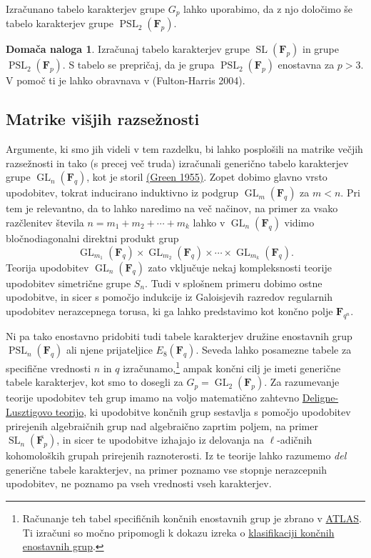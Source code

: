 \documentclass[11pt]{book}
\def\FF{\mathbf{F}}
\DeclareMathOperator\GL{GL}
\DeclareMathOperator\SL{SL}
\DeclareMathOperator\PSL{PSL}
\def\literatura{\color{modra}}
\theoremstyle{definition}
\theoremstyle{zgled}
\theoremstyle{odprtproblem}
\theoremstyle{domacanaloga}
\newtheorem*{domacanaloga}{Domača naloga}
\theoremstyle{izrek}
\begin{document}
Izračunano tabelo karakterjev grupe $G_p$ lahko uporabimo, da z njo določimo še tabelo karakterjev grupe $\PSL_2(\FF_p)$.

\begin{domacanaloga}
Izračunaj tabelo karakterjev grupe $\SL(\FF_p)$ in grupe $\PSL_2(\FF_p)$. S tabelo se prepričaj, da je grupa $\PSL_2(\FF_p)$ enostavna za $p > 3$. V pomoč ti je lahko obravnava v {\literatura (Fulton-Harris 2004)}.
\end{domacanaloga}

\subsection{Matrike višjih razsežnosti}

Argumente, ki smo jih videli v tem razdelku, bi lahko posplošili na matrike večjih razsežnosti in tako (s precej več truda) izračunali generično tabelo karakterjev grupe $\GL_n(\FF_q)$, kot je storil \href{https://www.jstor.org/stable/1992997#metadata_info_tab_contents}{(Green 1955)}. Zopet dobimo glavno vrsto upodobitev, tokrat inducirano induktivno iz podgrup $\GL_m(\FF_q)$ za $m < n$. Pri tem je relevantno, da to lahko naredimo na več načinov, na primer za vsako razčlenitev števila $n = m_1 + m_2 + \cdots + m_k$ lahko v $\GL_n(\FF_q)$ vidimo bločnodiagonalni direktni produkt grup
\[
    \textstyle  \GL_{m_1}(\FF_q) \times \GL_{m_2}(\FF_q) \times \cdots \times \GL_{m_k}(\FF_q).  
\]
Teorija upodobitev $\GL_n(\FF_q)$ zato vključuje nekaj kompleksnosti teorije upodobitev simetrične grupe $S_n$. Tudi v splošnem primeru dobimo ostne upodobitve, in sicer s pomočjo indukcije iz Galoisjevih razredov regularnih upodobitev nerazcepnega torusa, ki ga lahko predstavimo kot končno polje $\FF_{q^n}$.

Ni pa tako enostavno pridobiti tudi tabele karakterjev družine enostavnih grup $\PSL_n(\FF_q)$ ali njene prijateljice $E_8(\FF_q)$. Seveda lahko posamezne tabele za specifične vrednosti $n$ in $q$ izračunamo,\footnote{Računanje teh tabel specifičnih končnih enostavnih grup je zbrano v \href{http://brauer.maths.qmul.ac.uk/Atlas/v3/}{ATLAS}. Ti izračuni so močno pripomogli k dokazu izreka o \href{https://en.wikipedia.org/wiki/Classification_of_finite_simple_groups}{klasifikaciji končnih enostavnih grup}.} ampak končni cilj je imeti generične tabele karakterjev, kot smo to dosegli za $G_p = \GL_2(\FF_p)$. Za razumevanje teorije upodobitev teh grup imamo na voljo matematično zahtevno \href{https://en.wikipedia.org/wiki/Deligne–Lusztig_theory}{Deligne-Lusztigovo teorijo}, ki upodobitve končnih grup sestavlja s pomočjo upodobitev prirejenih algebraičnih grup nad algebraično zaprtim poljem, na primer $\SL_n(\overline{\FF_p})$, in sicer te upodobitve izhajajo iz delovanja na $\ell$-adičnih kohomoloških grupah prirejenih raznoterosti. Iz te teorije lahko razumemo \emph{del} generične tabele karakterjev, na primer poznamo vse stopnje nerazcepnih upodobitev, ne poznamo pa vseh vrednosti vseh karakterjev.
\end{document}
